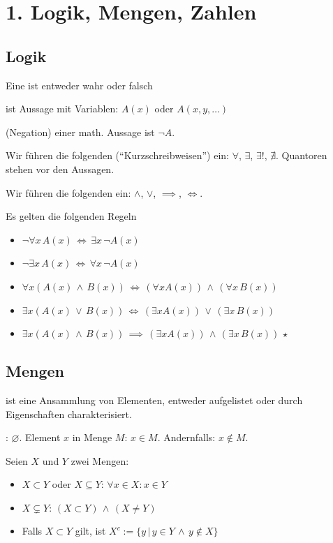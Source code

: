 \section{1. Logik, Mengen, Zahlen}
\subsection{Logik}

\Def Eine  ist entweder wahr oder falsch

\Def {} ist Aussage mit Variablen: $A(x)$ oder $A(x, y, \ldots)$ 

\Def {} (Negation) einer math. Aussage ist $\lnot A$.

\Def Wir führen die folgenden  (``Kurzschreibweisen'') ein:
$\forall$, $\exists$, $\exists!$, $\nexists$. 
Quantoren stehen vor den Aussagen.

\Def Wir führen die folgenden  ein:
$\land$, $\lor$, $\implies$, $\iff$.

\Satz Es gelten die folgenden Regeln
\vspace{-0.6em}
\begin{itemize}
    \item $\lnot \forall x \, A(x) \, \iff \, \exists x \, \lnot A(x)$
    \item $\lnot \exists x \, A(x) \, \iff \, \forall x \, \lnot A(x)$
    \item $\forall x (A(x) \, \land \, B(x)) \, \iff \, (\forall x A(x)) \, \land \, (\forall x \, B(x))$
    \item $\exists x (A(x) \, \lor \, B(x)) \, \iff \, (\exists x A(x)) \, \lor \, (\exists x \, B(x))$
    \item $\exists x (A(x) \, \land \, B(x)) \, \implies \, (\exists x A(x)) \, \land \, (\exists x \, B(x))$ \hspace{10pt} $\star$
\end{itemize}

\subsection{Mengen}

\Def {} ist eine Ansammlung von  Elementen, entweder aufgelistet
oder durch Eigenschaften charakterisiert.

: $\varnothing$. Element $x$ in Menge $M$: $x \in M$. Andernfalls: $x \notin M$.

\Def Seien $X$ und $Y$ zwei Mengen:
\vspace{-0.6em}
\begin{itemize}
    \item {} $X \subset Y$ oder $X \subseteq Y$: $\forall x \in X : x \in Y$
    \item {} $X \subsetneq Y$: $(X \subset Y) \, \land \, (X\ne Y)$
    \item {} Falls $X \subset Y$ gilt, ist $X^c := \{y \, | \, y \in Y \, \land \, y \notin X\}$
\end{itemize}

